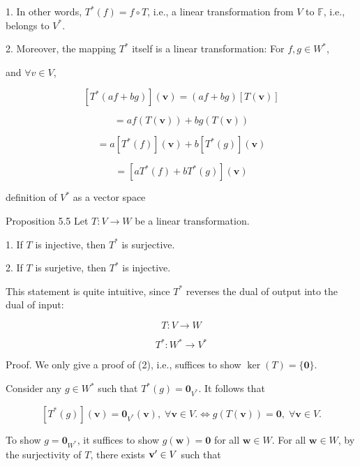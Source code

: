 \documentclass[11pt]{article}
\begin{document}
1. In other words, \({T}^{ * }\left( f\right)  = f \circ  T\), i.e., a linear transformation from \(V\) to \(\mathbb{F}\), i.e., belongs to \({V}^{ * }\).

2. Moreover, the mapping \({T}^{ * }\) itself is a linear transformation: For \(f,g \in  {W}^{ * }\),

and \(\forall v \in  V\),

\[
\left\lbrack  {{T}^{ * }\left( {{af} + {bg}}\right) }\right\rbrack  \left( \mathbf{v}\right)  = \left( {{af} + {bg}}\right) \left\lbrack  {T\left( \mathbf{v}\right) }\right\rbrack
\]

\[
= {af}\left( {T\left( \mathbf{v}\right) }\right)  + {bg}\left( {T\left( \mathbf{v}\right) }\right)
\]

\[
= a\left\lbrack  {{T}^{ * }\left( f\right) }\right\rbrack  \left( \mathbf{v}\right)  + b\left\lbrack  {{T}^{ * }\left( g\right) }\right\rbrack  \left( \mathbf{v}\right)
\]

\[
= \left\lbrack  {a{T}^{ * }\left( f\right)  + b{T}^{ * }\left( g\right) }\right\rbrack  \left( \mathbf{v}\right)
\]

definition of \({V}^{ * }\) as a vector space

Proposition 5.5 Let \(T : V \rightarrow  W\) be a linear transformation.

1. If \(T\) is injective, then \({T}^{ * }\) is surjective.

2. If \(T\) is surjetive, then \({T}^{ * }\) is injective.

This statement is quite intuitive, since \({T}^{ * }\) reverses the dual of output into the dual of input:

\[
T : V \rightarrow  W
\]

\[
{T}^{ * } : {W}^{ * } \rightarrow  {V}^{ * }
\]

Proof. We only give a proof of (2), i.e., suffices to show \(\ker \left( T\right)  = \{ \mathbf{0}\}\).

Consider any \(g \in  {W}^{ * }\) such that \({T}^{ * }\left( g\right)  = {\mathbf{0}}_{{V}^{ * }}\). It follows that

\[
\left\lbrack  {{T}^{ * }\left( g\right) }\right\rbrack  \left( \mathbf{v}\right)  = {\mathbf{0}}_{{V}^{ * }}\left( \mathbf{v}\right) ,\;\forall \mathbf{v} \in  V. \Leftrightarrow  g\left( {T\left( \mathbf{v}\right) }\right)  = \mathbf{0},\;\forall \mathbf{v} \in  V. \tag{5.4}
\]

To show \(g = {\mathbf{0}}_{{W}^{ * }}\), it suffices to show \(g\left( \mathbf{w}\right)  = \mathbf{0}\) for all \(\mathbf{w} \in  W\). For all \(\mathbf{w} \in  W\), by the surjectivity of \(T\), there exists \({\bf v}^{\prime } \in  V\) such that
\end{document}
